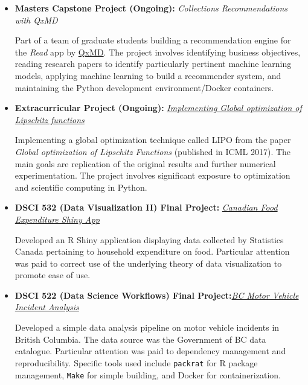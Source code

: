 \documentclass[11pt,a4paper,sans]{moderncv}        %
\begin{document}
\begin{itemize}

\item{\textbf{Masters Capstone Project (Ongoing):} \textit{Collections Recommendations with QxMD}

\vspace{3pt}

\small{Part of a team of graduate students building a recommendation engine 
for the \textit{Read} app by \href{https://qxmd.com/}{QxMD}. The project involves identifying business objectives, reading research papers to identify particularly pertinent machine learning models, applying machine learning to build a recommender system, and maintaining the Python development environment/Docker containers.}}

\vspace{6pt}

\item{\textbf{Extracurricular Project (Ongoing):} \textit{\href{https://github.com/UBC-CS/lipo-python}{Implementing Global optimization of Lipschitz functions}}

\vspace{3pt}

\small{Implementing a global optimization technique 
called LIPO from the paper \textit{Global optimization of Lipschitz Functions} (published in ICML 2017). The main goals are replication of the original results and further 
numerical experimentation. The project involves significant exposure to optimization and scientific computing in Python.}}

\vspace{6pt}

\item{\textbf{DSCI 532 (Data Visualization II) Final Project:} \textit{\href{https://github.com/bradleypick/food-expenditure}{Canadian Food Expenditure Shiny App}}

\vspace{3pt}

\small{Developed an R Shiny application displaying data 
collected by Statistics Canada pertaining to household expenditure on food. Particular 
attention was paid to correct use of the underlying theory of data visualization to promote ease of use.}}

\vspace{6pt}

\item{\textbf{DSCI 522 (Data Science Workflows) Final Project:}\textit{\href{https://github.com/bradleypick/BC-motor-vehicle-incidents}{BC Motor Vehicle Incident Analysis}}

\vspace{3pt}

\small{Developed a simple data analysis pipeline on motor 
vehicle incidents in British Columbia. The data source was the Government of BC data catalogue.
Particular attention was paid to dependency management and reproducibility. 
Specific tools used include \texttt{packrat} for R package management, \texttt{Make} for simple building, and 
Docker for containerization.}}

\end{itemize}
\end{document}
